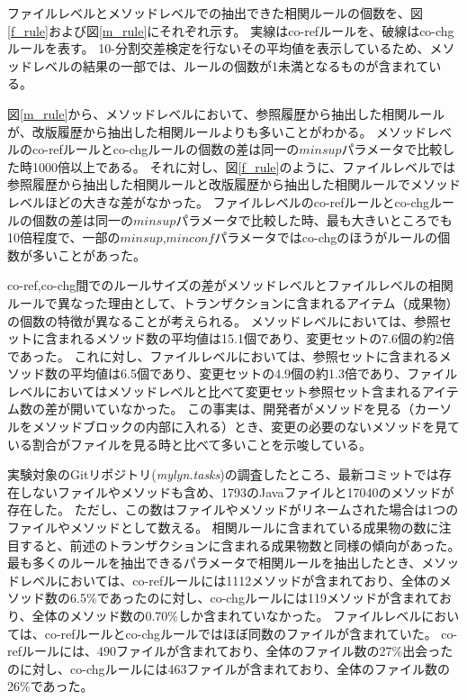 \documentclass[a4paper]{jsbook}
\newcommand{\minconf}{mincon\!f}
\begin{document}
ファイルレベルとメソッドレベルでの抽出できた相関ルールの個数を、図\ref{f_rule}および図\ref{m_rule}にそれぞれ示す。
実線はco-refルールを、破線はco-chgルールを表す。
10-分割交差検定を行ないその平均値を表示しているため、メソッドレベルの結果の一部では、ルールの個数が1未満となるものが含まれている。

図\ref{m_rule}から、メソッドレベルにおいて、参照履歴から抽出した相関ルールが、改版履歴から抽出した相関ルールよりも多いことがわかる。
メソッドレベルのco-refルールとco-chgルールの個数の差は同一の$minsup$パラメータで比較した時1000倍以上である。
それに対し、図\ref{f_rule}のように、ファイルレベルでは参照履歴から抽出した相関ルールと改版履歴から抽出した相関ルールでメソッドレベルほどの大きな差がなかった。
ファイルレベルのco-refルールとco-chgルールの個数の差は同一の$minsup$パラメータで比較した時、最も大きいところでも10倍程度で、一部の$minsup$,$\minconf$パラメータではco-chgのほうがルールの個数が多いことがあった。

co-ref,co-chg間でのルールサイズの差がメソッドレベルとファイルレベルの相関ルールで異なった理由として、トランザクションに含まれるアイテム（成果物）の個数の特徴が異なることが考えられる。
メソッドレベルにおいては、参照セットに含まれるメソッド数の平均値は15.1個であり、変更セットの7.6個の約2倍であった。
これに対し、ファイルレベルにおいては、参照セットに含まれるメソッド数の平均値は6.5個であり、変更セットの4.9個の約1.3倍であり、ファイルレベルにおいてはメソッドレベルと比べて変更セット参照セット含まれるアイテム数の差が開いていなかった。
この事実は、開発者がメソッドを見る（カーソルをメソッドブロックの内部に入れる）とき、変更の必要のないメソッドを見ている割合がファイルを見る時と比べて多いことを示唆している。

実験対象のGitリポジトリ({\it mylyn.tasks})の調査したところ、最新コミットでは存在しないファイルやメソッドも含め、1793のJavaファイルと17040のメソッドが存在した。
ただし、この数はファイルやメソッドがリネームされた場合は1つのファイルやメソッドとして数える。
相関ルールに含まれている成果物の数に注目すると、前述のトランザクションに含まれる成果物数と同様の傾向があった。
最も多くのルールを抽出できるパラメータで相関ルールを抽出したとき、メソッドレベルにおいては、co-refルールには1112メソッドが含まれており、全体のメソッド数の6.5\%であったのに対し、co-chgルールには119メソッドが含まれており、全体のメソッド数の0.70\%しか含まれていなかった。
ファイルレベルにおいては、co-refルールとco-chgルールではほぼ同数のファイルが含まれていた。
co-refルールには、490ファイルが含まれており、全体のファイル数の27\%出会ったのに対し、co-chgルールには463ファイルが含まれており、全体のファイル数の26\%であった。
\end{document}
